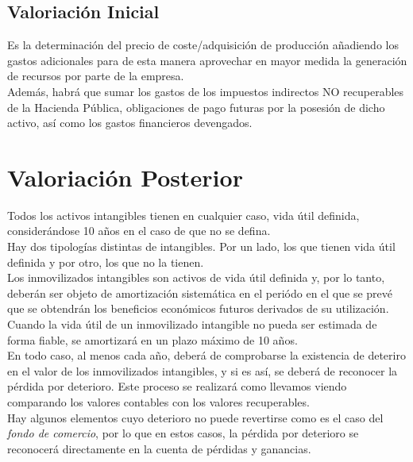 \documentclass[a4paper,12pt]{article}
\begin{document}
\subsection{Valoriación Inicial}
Es la determinación del precio de coste/adquisición de producción añadiendo los gastos adicionales para de esta manera aprovechar en mayor medida la generación de recursos por parte de la empresa.\\

Además, habrá que sumar los gastos de los impuestos indirectos NO recuperables de la Hacienda Pública, obligaciones de pago futuras por la posesión de dicho activo, así como los gastos financieros devengados.\\

\section{Valoriación Posterior}
Todos los activos intangibles tienen en cualquier caso, vida útil definida, considerándose 10 años en el caso de que no se defina.\\

Hay dos tipologías distintas de intangibles. Por un lado, los que tienen vida útil definida y por otro, los que no la tienen.\\

Los inmovilizados intangibles son activos de vida útil definida y, por lo tanto, deberán ser objeto de amortización sistemática en el periódo en el que se prevé que se obtendrán los beneficios económicos futuros derivados de su utilización.\\

Cuando la vida útil de un inmovilizado intangible no pueda ser estimada de forma fiable, se amortizará en un plazo máximo de 10 años.\\

En todo caso, al menos cada año, deberá de comprobarse la existencia de deteriro en el valor de los inmovilizados intangibles, y si es así, se deberá de reconocer la pérdida por deterioro. Este proceso se realizará como llevamos viendo comparando los valores contables con los valores recuperables.\\

Hay algunos elementos cuyo deterioro no puede revertirse como es el caso del \textit{fondo de comercio}, por lo que en estos casos, la pérdida por deterioro se reconocerá directamente en la cuenta de pérdidas y ganancias.\\
\end{document}
